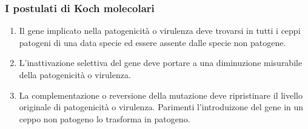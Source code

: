 \subsubsection{I postulati di Koch molecolari}
\begin{enumerate}
\item Il gene implicato nella patogenicit\`a o virulenza deve trovarsi in tutti i ceppi patogeni di una data specie ed essere assente dalle specie non 
patogene.
\item L'inattivazione selettiva del gene deve portare a una diminuzione misurabile della patogenicit\`a o virulenza.
\item La complementazione o reversione della mutazione deve ripristinare il livello originale di patogenicit\`a o virulenza. Parimenti l'introduizone del
gene in un ceppo non patogeno lo trasforma in patogeno.
\end{enumerate}
